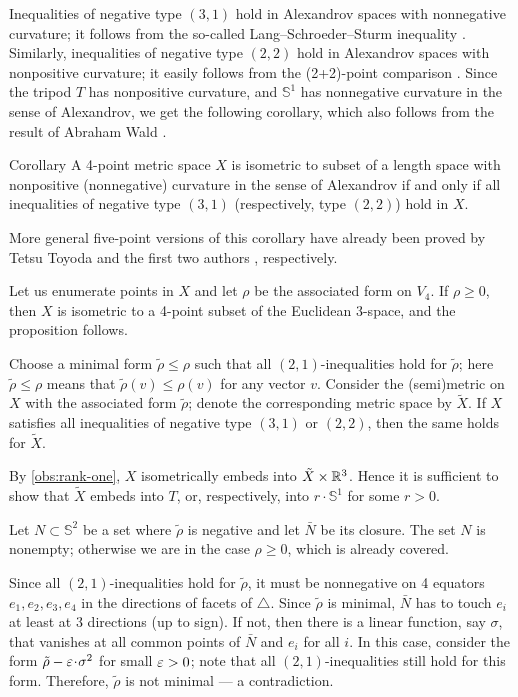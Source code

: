 \documentclass[a4paper,10pt]{article}
\begin{document}
Inequalities of negative type $(3, 1)$ hold in Alexandrov spaces with nonnegative curvature; it follows from the so-called Lang--Schroeder--Sturm inequality \cite{lang-schroeder, sturm}.
Similarly, inequalities of negative type $(2, 2)$ hold in Alexandrov spaces with nonpositive curvature; it easily follows from the (2+2)-point comparison \cite[9.5]{AKP-2024}.
Since the tripod $T$ has nonpositive curvature, and $\mathbb{S}^1$ has nonnegative curvature in the sense of Alexandrov, we get the following corollary, which also follows from the result of Abraham Wald \cite[§ 7]{wald}.

\begin{thm}{Corollary}\label{cor:Four-point arrays}
A 4-point metric space $X$ is isometric to subset of a length space with nonpositive (nonnegative) curvature in the sense of Alexandrov if and only if all inequalities of negative type $(3, 1)$ (respectively, type $(2, 2)$) hold in $X$.
\end{thm}

More general five-point versions of this corollary have already been proved by Tetsu Toyoda \cite{toyoda,lebedeva-petrunin2021} and the first two authors \cite{lebedeva-petrunin-2024}, respectively.


Let us enumerate points in $X$ and let $\rho$ be the associated form on $V_4$.
If $\rho\ge 0$, then $X$ is isometric to a 4-point subset of the Euclidean 3-space,
and the proposition follows.

Choose a minimal form $\tilde\rho\le \rho$ such that all $(2,1)$-inequalities hold for $\tilde\rho$;
here $\tilde\rho\le \rho$ means that $\tilde\rho(v)\le \rho(v)$ for any vector $v$.
Consider the (semi)metric on $X$ with the associated form $\tilde\rho$;
denote the corresponding metric space by $\tilde X$.
If $X$ satisfies all inequalities of negative type $(3, 1)$ or $(2,2)$, then the same holds for $\tilde X$.

By \ref{obs:rank-one}, $X$ isometrically embeds into $\tilde X\times \mathbb{R}^3$.
Hence it is sufficient to show that $\tilde X$ embeds into $T$, or, respectively, into $r\cdot \mathbb{S}^1$ for some $r>0$.

Let $N\subset \mathbb{S}^2$ be a set where $\tilde\rho$ is negative and let $\bar N$ be its closure.
The set $N$ is nonempty; otherwise we are in the case $\rho\ge 0$, which is already covered.

Since all $(2,1)$-inequalities hold for $\tilde\rho$,
it must be nonnegative on 4 equators $e_1,e_2,e_3,e_4$ in the directions of facets of $\triangle$.
Since $\tilde\rho$ is minimal, $\bar N$ has to touch $e_i$ at least at 3 directions (up to sign). 
If not, then there is a linear function, say $\sigma$, that vanishes at all common points of $\bar N$ and $e_i$ for all $i$.
In this case, consider the form $\tilde\rho-\eps\cdot \sigma^2$ for small $\varepsilon>0$;
note that all $(2,1)$-inequalities still hold for this form.
Therefore, $\tilde\rho$ is not minimal --- a contradiction.
\end{document}
